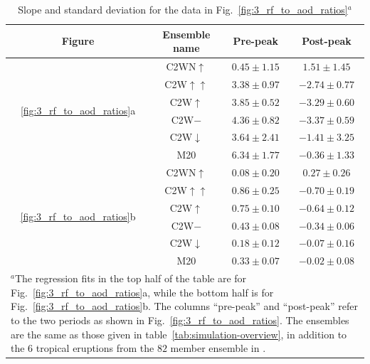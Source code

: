 \documentclass[draft]{agujournal2019}
\begin{document}
\begin{table}
  \centering

  \caption{Slope and standard deviation for the data in
    Fig.~\ref{fig:3_rf_to_aod_ratios}\(^{a}\)}\label{tab:slope-gradients}%
  \begin{tabular}{cccc}
    \toprule
    Figure                                         & Ensemble name           & Pre-peak        & Post-peak        \\
    \midrule
                                                   & C2WN\(\uparrow\)        & \(0.45\pm1.15\) & \(1.51\pm1.45\)  \\
                                                   & C2W\(\uparrow\uparrow\) & \(3.38\pm0.97\) & \(-2.74\pm0.77\) \\
    \multirow{2}{*}{\ref{fig:3_rf_to_aod_ratios}a} & C2W\(\uparrow\)         & \(3.85\pm0.52\) & \(-3.29\pm0.60\) \\
                                                   & C2W\(-\)                & \(4.36\pm0.82\) & \(-3.37\pm0.59\) \\
                                                   & C2W\(\downarrow\)       & \(3.64\pm2.41\) & \(-1.41\pm3.25\) \\
                                                   & M20                     & \(6.34\pm1.77\) & \(-0.36\pm1.33\) \\
    \midrule
                                                   & C2WN\(\uparrow\)        & \(0.08\pm0.20\) & \(0.27\pm0.26\)  \\
                                                   & C2W\(\uparrow\uparrow\) & \(0.86\pm0.25\) & \(-0.70\pm0.19\) \\
    \multirow{2}{*}{\ref{fig:3_rf_to_aod_ratios}b} & C2W\(\uparrow\)         & \(0.75\pm0.10\) & \(-0.64\pm0.12\) \\
                                                   & C2W\(-\)                & \(0.43\pm0.08\) & \(-0.34\pm0.06\) \\
                                                   & C2W\(\downarrow\)       & \(0.18\pm0.12\) & \(-0.07\pm0.16\) \\
                                                   & M20                     & \(0.33\pm0.07\) & \(-0.02\pm0.08\) \\
    \toprule
    \multicolumn{4}{l}{\parbox{\linewidth}{\(^{a}\)The regression fits in the top half of the table are for
        Fig.~\ref{fig:3_rf_to_aod_ratios}a, while the bottom half is for
        Fig.~\ref{fig:3_rf_to_aod_ratios}b. The columns ``pre-peak'' and ``post-peak'' refer to
        the two periods as shown in Fig.~\ref{fig:3_rf_to_aod_ratios}. The ensembles are the
        same as those given in table~\ref{tab:simulation-overview}, in addition to the \(6\)
        tropical eruptions from the \(82\) member ensemble in
    .}}                                                                                       \\
  \end{tabular}
\end{table}
\end{document}

